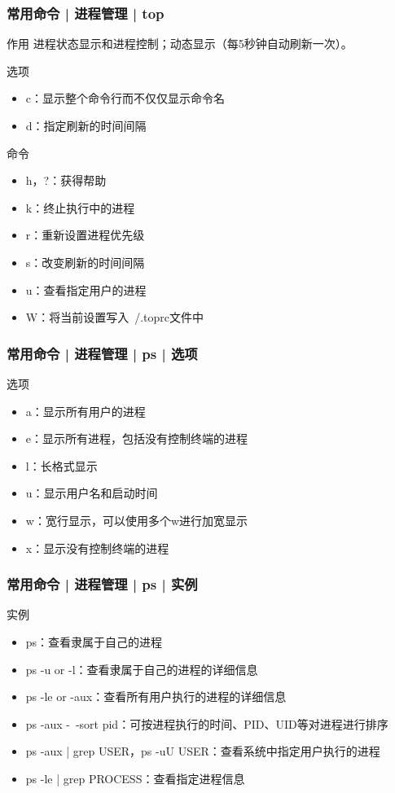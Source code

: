 \begin{frame}
  \frametitle{常用命令 | 进程管理 | top}
  \begin{block}{作用}
    进程状态显示和进程控制；动态显示（每5秒钟自动刷新一次）。
  \end{block}
  \pause
  \begin{block}{选项}
    \begin{itemize}
      \item c：显示整个命令行而不仅仅显示命令名
      \item d：指定刷新的时间间隔
    \end{itemize}
  \end{block}
  \pause
  \begin{block}{命令}
    \begin{itemize}
      \item h，?：获得帮助
      \item k：终止执行中的进程
      \item r：重新设置进程优先级
      \item s：改变刷新的时间间隔
      \item u：查看指定用户的进程
      \item W：将当前设置写入~/.toprc文件中
    \end{itemize}
  \end{block}
\end{frame}

\begin{frame}
  \frametitle{常用命令 | 进程管理 | ps | 选项}
  \begin{block}{选项}
    \begin{itemize}
      \item a：显示所有用户的进程
      \item e：显示所有进程，包括没有控制终端的进程
      \item l：长格式显示
      \item u：显示用户名和启动时间
      \item w：宽行显示，可以使用多个w进行加宽显示
      \item x：显示没有控制终端的进程
    \end{itemize}
  \end{block}
\end{frame}

\begin{frame}
  \frametitle{常用命令 | 进程管理 | ps | 实例}
  \begin{block}{实例}
    \begin{itemize}
      \item ps：查看隶属于自己的进程
      \item ps -u or -l：查看隶属于自己的进程的详细信息
      \item ps -le or -aux：查看所有用户执行的进程的详细信息
      \item ps -aux -\ -sort pid：可按进程执行的时间、PID、UID等对进程进行排序
      \item ps -aux | grep USER，ps -uU USER：查看系统中指定用户执行的进程
      \item ps -le | grep PROCESS：查看指定进程信息
    \end{itemize}
  \end{block}
\end{frame}


